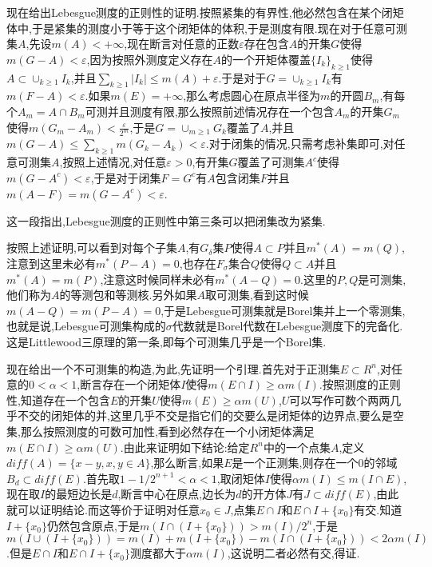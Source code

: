 现在给出Lebesgue测度的正则性的证明.按照紧集的有界性,他必然包含在某个闭矩体中,于是紧集的测度小于等于这个闭矩体的体积,于是测度有限.现在对于任意可测集$A$,先设$m(A)<+\infty$,现在断言对任意的正数$\varepsilon$存在包含$A$的开集$G$使得$m(G-A)<\varepsilon$,因为按照外测度定义存在$A$的一个开矩体覆盖$\{I_k\}_{k\ge1}$使得$A\subset\cup_{k\ge1}I_k$,并且$\sum_ {k\ge1}|I_k|\le m(A)+\varepsilon$.于是对于$G=\cup_ {k\ge1}I_k$有$m(F-A)<\varepsilon$.如果$m(E)=+\infty$,那么考虑圆心在原点半径为$m$的开圆$B_m$,有每个$A_m=A\cap B_m$可测并且测度有限,那么按照前述情况存在一个包含$A_m$的开集$G_m$使得$m(G_m-A_m)<\frac{\varepsilon} {2^m}$,于是$G=\cup_{m\ge1}G_k$覆盖了$A$,并且$m(G-A)\le\sum_ {k\ge1}m(G_k-A_k)<\varepsilon$.对于闭集的情况,只需考虑补集即可,对任意可测集$A$,按照上述情况,对任意$\varepsilon>0$,有开集$G$覆盖了可测集$A^c$使得$m(G-A^c)<\varepsilon$,于是对于闭集$F=G^c$有$A$包含闭集$F$并且$m(A-F)=m(G-A^c)<\varepsilon$.

这一段指出,Lebesgue测度的正则性中第三条可以把闭集改为紧集.

按照上述证明,可以看到对每个子集$A$,有$G_{\delta}$集$P$使得$A\subset P$并且$m^*(A)=m(Q)$,注意到这里未必有$m^*(P-A)=0$,也存在$F_{\sigma}$集合$Q$使得$Q\subset A$并且$m^*(A)=m(P)$,注意这时候同样未必有$m^* (A-Q)=0$.这里的$P,Q$是可测集,他们称为$A$的等测包和等测核.另外如果$A$取可测集,看到这时候$m(A-Q)=m(P-A)=0$,于是Lebesgue可测集就是Borel集并上一个零测集,也就是说,Lebesgue可测集构成的$\sigma$代数就是Borel代数在Lebesgue测度下的完备化.这是Littlewood三原理的第一条,即每个可测集几乎是一个Borel集.

现在给出一个不可测集的构造,为此,先证明一个引理.首先对于正测集$E\subset R^n$,对任意的$0<\alpha<1$,断言存在一个闭矩体$I$使得$m(E\cap I)\ge\alpha m(I)$.按照测度的正则性,知道存在一个包含$E$的开集$U$使得$m(E)\ge\alpha m(U)$,$U$可以写作可数个两两几乎不交的闭矩体的并,这里几乎不交是指它们的交要么是闭矩体的边界点,要么是空集,那么按照测度的可数可加性,看到必然存在一个小闭矩体满足$m(E\cap I)\ge\alpha m(U)$.由此来证明如下结论:给定$R^n$中的一个点集$A$,定义$diff(A)=\{x-y,x,y\in A\}$,那么断言,如果$E$是一个正测集,则存在一个0的邻域$B_d\subset diff(E)$.首先取$1-1/2^{n+1}<\alpha<1$,取闭矩体$I$使得$\alpha m(I)\le m(I\cap E)$,现在取$I$的最短边长是$d$,断言中心在原点,边长为$d$的开方体$J$有$J\subset diff(E)$,由此就可以证明结论.而这等价于证明对任意$x_0\in J$,点集$E\cap I$和$E\cap I+\{x_0\}$有交.知道$I+\{x_0\}$仍然包含原点,于是$m(I\cap(I+\{x_0\}))>m(I)/2^n$,于是$m(I\cup(I+\{x_0\}))=m(I)+m(I+\{x_0\})-m(I\cap(I+\{x_0\}))<2\alpha m(I)$.但是$E\cap I$和$E\cap I+\{x_0\}$测度都大于$\alpha m(I)$,这说明二者必然有交,得证.

